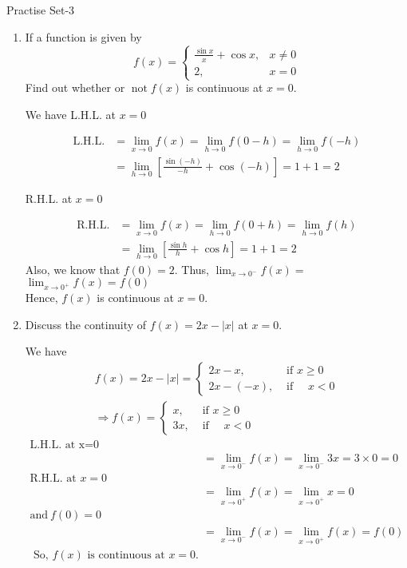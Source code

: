 \newpage\begin{abox}
	Practise Set-3
\end{abox}
\begin{enumerate}
	\item If a function is given by
	$$
	f(x)=\left\{\begin{array}{cl}
	\frac{\sin x}{x}+\cos x, & x \neq 0 \\
	2, & x=0
	\end{array}\right.
	$$
	Find out whether or $\operatorname{not} f(x)$ is continuous at $x=0$.
	\begin{answer}
	We have
	L.H.L. at $x=0$
	
	\begin{align*}
	\text{L.H.L.}&=\lim _{x \rightarrow 0} f(x)=\lim _{h \rightarrow 0} f(0-h)=\lim _{h \rightarrow 0} f(-h) \\
	&=\lim _{h \rightarrow 0}\left[\frac{\sin (-h)}{-h}+\cos (-h)\right]=1+1=2
	\end{align*}
	
	R.H.L. at $x=0$
	
	\begin{align*}
	\text{R.H.L.}&=\lim _{x \rightarrow 0} f(x)=\lim _{h \rightarrow 0} f(0+h)=\lim _{h \rightarrow 0} f(h) \\
	&=\lim _{h \rightarrow 0}\left[\frac{\sin h}{h}+\cos h\right]=1+1=2
	\end{align*}
	Also, we know that $f(0)=2 .$ Thus, $\lim _{x \rightarrow 0^{-}} f(x)=$ $\lim _{x \rightarrow 0^{+}} f(x)=f(0)$
	\\Hence, $f(x)$ is continuous at $x=0$.
	
	\end{answer}
\item Discuss the continuity of $f(x)=2 x-|x|$ at $x=0$.
\begin{answer}
	We have
	$$
	\begin{array}{c}
	f(x)=2 x-|x|=\left\{\begin{aligned}
	2 x-x, & \text { if } x \geq 0 \\
	2 x-(-x), & \text { if } \quad x<0
	\end{aligned}\right. \\
	\Rightarrow f(x)=\left\{\begin{aligned}
	x, & \text { if } x \geq 0 \\
	3 x, & \text { if } \quad x<0
	\end{aligned}\right.
	\end{array}
	$$
	\begin{align*}
	\text{L.H.L. at x=0}\\
	&=\lim _{x \rightarrow 0^{-}} f(x)=\lim _{x \rightarrow 0^{-}} 3 x=3 \times 0=0\\
	\text{R.H.L. at }x=0\\
	&=\lim _{x \rightarrow 0^{+}} f(x)=\lim _{x \rightarrow 0^{+}}x=0\\
	\text{and}\ f(0)=0\\
	&=\lim _{x \rightarrow 0^{-}} f(x)=\lim _{x \rightarrow 0^{+}} f(x)=f(0)\\
	\text{	So, $f(x)$ is continuous at $x=0$.}
	\end{align*}


\end{answer}
\end{enumerate}
